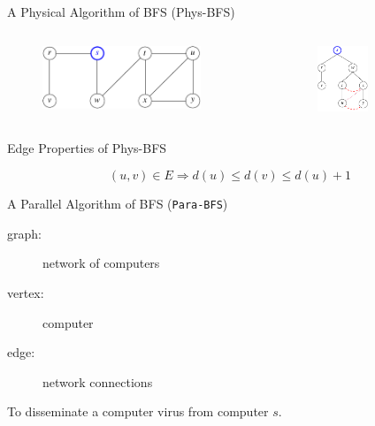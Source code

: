 \documentclass{beamer}
\begin{document}
\begin{frame}{A Physical Algorithm of BFS (\textsf{Phys-BFS})}
  \begin{columns}
	  \begin{figure}[htp]
	    \centering
		\includegraphics[width = 0.85\textwidth]{figure/bfs-graph.pdf}
	  \end{figure}
	  \begin{figure}[htp]
	    \centering
		\includegraphics[width = 0.50\textwidth]{figure/bfs-physical-alg.pdf}
	  \end{figure}
  \end{columns}
\end{frame}
\begin{frame}{Edge Properties of \textsf{Phys-BFS}}
  \begin{mdframed}[linecolor = blue, leftmargin = 2cm, rightmargin = 2cm]
    \[ (u,v) \in E \Rightarrow d(u) \le d(v) \le d(u) + 1 \]
  \end{mdframed}
\end{frame}
\begin{frame}{A Parallel Algorithm of BFS (\texttt{Para-BFS})}
  \begin{description}
    \item[graph:] network of computers
    \item[vertex:] computer
    \item[edge:] network connections
  \end{description}

  \vspace{0.50cm}
  \begin{center}
  	To disseminate a computer virus from computer $s$.
  \end{center}
\end{frame}
\end{document}
